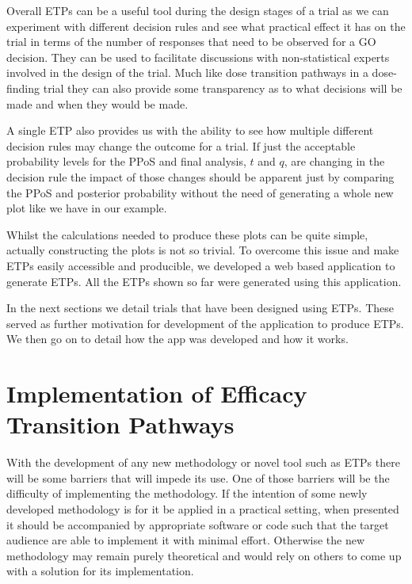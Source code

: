 Overall ETPs can be a useful tool during the design stages of a trial as we can experiment with different decision rules and see what practical effect it has on the trial in terms of the number of responses that need to be observed for a GO decision. They can be used to facilitate discussions with non-statistical experts involved in the design of the trial. Much like dose transition pathways in a dose-finding trial they can also provide some transparency as to what decisions will be made and when they would be made. 

A single ETP also provides us with the ability to see how multiple different decision rules may change the outcome for a trial. If just the acceptable probability levels for the PPoS and final analysis, $t$ and $q$, are changing in the decision rule the impact of those changes should be apparent just by comparing the PPoS and posterior probability without the need of generating a whole new plot like we have in our example.

Whilst the calculations needed to produce these plots can be quite simple, actually constructing the plots is not so trivial. To overcome this issue and make ETPs easily accessible and producible, we developed a web based application to generate ETPs. All the ETPs shown so far were generated using this application. 

In the next sections we detail trials that have been designed using ETPs. These served as further motivation for development of the application to produce ETPs. We then go on to detail how the app was developed and how it works.    


\section{Implementation of Efficacy Transition Pathways}

With the development of any new methodology or novel tool such as ETPs there will be some barriers that will impede its use. One of those barriers will be the difficulty of implementing the methodology. If the intention of some newly developed methodology is for it be applied in a practical setting, when presented it should be accompanied by appropriate software or code such that the target audience are able to implement it with minimal effort. Otherwise the new methodology may remain purely theoretical and would rely on others to come up with a solution for its implementation. 

